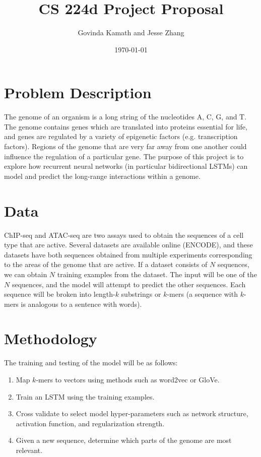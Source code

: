 \documentclass[11pt,onecolumn]{article}
\title{CS 224d Project Proposal}
\author{Govinda Kamath and Jesse Zhang}
\date{\today}
\begin{document}
\maketitle
 
\section{Problem Description}
The genome of an organism is a long string of the nucleotides A, C, G, and T. The genome contains genes which are translated into proteins essential for life, and genes are regulated by a variety of epigenetic factors (e.g. transcription factors). Regions of the genome that are very far away from one another could influence the regulation of a particular gene. The purpose of this project is to explore how recurrent neural networks (in particular bidirectional LSTMs) can model and predict the long-range interactions within a genome. 

\section{Data}
ChIP-seq and ATAC-seq are two assays used to obtain the sequences of a cell type that are active. Several datasets are available online (ENCODE), and these datasets have both sequences obtained from multiple experiments corresponding to the areas of the genome that are active. If a dataset consists of $N$ sequences, we can obtain $N$ training examples from the dataset. The input will be one of the $N$ sequences, and the model will attempt to predict the other sequences. Each sequence will be broken into length-$k$ substrings or $k$-mers (a sequence with $k$-mers is analogous to a sentence with words).

\section{Methodology}
The training and testing of the model will be as follows:
\begin{enumerate}
	\item Map $k$-mers to vectors using methods such as word2vec or GloVe. 
	\item Train an LSTM using the training examples.
	\item Cross validate to select model hyper-parameters such as network structure, activation function, and regularization strength.
	\item Given a new sequence, determine which parts of the genome are most relevant.
\end{enumerate}
\end{document}
